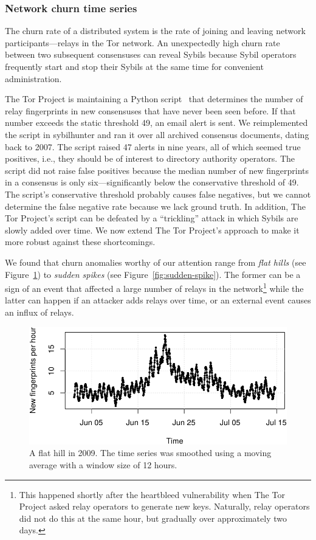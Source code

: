 \subsubsection{Network churn time series}
\label{sec:churn-time-series}
The churn rate of a distributed system is the rate of joining and leaving
network participants---relays in the Tor network.  An unexpectedly high churn
rate between two subsequent consensuses can reveal Sybils because Sybil
operators frequently start and stop their Sybils at the same time for convenient
administration.

The Tor Project is maintaining a Python script~\cite{doctor} that determines the
number of relay fingerprints in new consensuses that have never been seen
before.  If that number exceeds the static threshold 49, an email alert is sent.
We reimplemented the script in sybilhunter and ran it over all archived
consensus documents, dating back to 2007.  The script raised 47 alerts in nine
years, all of which seemed true positives, i.e., they should be of interest to
directory authority operators.  The script did not raise false positives because
the median number of new fingerprints in a consensus is only six---significantly
below the conservative threshold of 49.  The script's conservative threshold
probably causes false negatives, but we cannot determine the false negative rate
because we lack ground truth.  In addition, The Tor Project's script can be
defeated by a ``trickling'' attack in which Sybils are slowly added over time.
We now extend The Tor Project's approach to make it more robust against these
shortcomings.

We found that churn anomalies worthy of our attention range from \emph{flat
hills} (see Figure~\ref{fig:flat-hill}) to \emph{sudden spikes} (see
Figure~\ref{fig:sudden-spike}).  The former can be a sign of an event that
affected a large number of relays in the network\footnote{This happened shortly
after the heartbleed vulnerability when The Tor Project asked relay operators
to generate new keys.  Naturally, relay operators did not do this at the same
hour, but gradually over approximately two days.} while the latter can happen if
an attacker adds relays over time, or an external event causes an influx of
relays.

\begin{figure}[t]
	\centering
	\includegraphics[width=\linewidth]{diagrams/flat-hill.pdf}
	\caption{A flat hill in 2009.  The time series was smoothed using a moving
	average with a window size of 12 hours.}
	\label{fig:flat-hill}
\end{figure}

